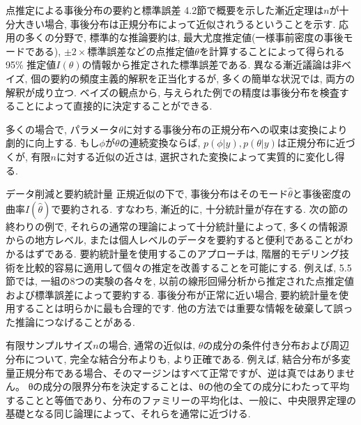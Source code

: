 \documentclass[10pt,dvipdfmx,a4]{beamer}
\begin{document}

\begin{frame}{点推定による事後分布の要約と標準誤差}
4.2節で概要を示した漸近定理は$n$が十分大きい場合, 事後分布は正規分布によって近似されうるということを示す.
応用の多くの分野で, 標準的な推論要約は, 最大尤度推定値(一様事前密度の事後モードである), $\pm 2\times$標準誤差などの点推定値$\theta$を計算することによって得られる95\% 推定値$I(\theta)$の情報から推定された標準誤差である.
異なる漸近議論は非ベイズ, 個の要約の頻度主義的解釈を正当化するが, 多くの簡単な状況では, 両方の解釈が成り立つ.
ベイズの観点から, 与えられた例での精度は事後分布を検査することによって直接的に決定することができる.

多くの場合で, パラメータ$\theta$に対する事後分布の正規分布への収束は変換により劇的に向上する.
もし$\phi$が$\theta$の連続変換ならば, $p(\phi|y), p(\theta|y)$は正規分布に近づくが, 有限$n$に対する近似の近さは, 選択された変換によって実質的に変化し得る.
\end{frame}


\begin{frame}{データ削減と要約統計量}
正規近似の下で, 事後分布はそのモード$\hat{\theta}$と事後密度の曲率$I(\hat{\theta})$で要約される.
すなわち, 漸近的に, 十分統計量が存在する.
次の節の終わりの例で, それらの通常の理論によって十分統計量によって, 多くの情報源からの地方レベル, または個人レベルのデータを要約すると便利であることがわかるはずである.
要約統計量を使用するこのアプローチは, 階層的モデリング技術を比較的容易に適用して個々の推定を改善することを可能にする.
例えば, 5.5節では, 一組の8つの実験の各々を, 以前の線形回帰分析から推定された点推定値および標準誤差によって要約する.
事後分布が正常に近い場合, 要約統計量を使用することは明らかに最も合理的です.
他の方法では重要な情報を破棄して誤った推論につなげることがある.

有限サンプルサイズ$n$の場合, 通常の近似は, $\theta$の成分の条件付き分布および周辺分布について, 完全な結合分布よりも, より正確である.
例えば, 結合分布が多変量正規分布である場合、そのマージンはすべて正常ですが、逆は真ではありません。
θの成分の限界分布を決定することは、θの他の全ての成分にわたって平均することと等価であり、分布のファミリーの平均化は、一般に、中央限界定理の基礎となる同じ論理によって、それらを通常に近づける.
\end{frame}

\end{document}
